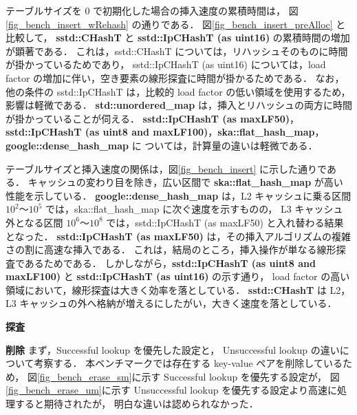 テーブルサイズを 0 で初期化した場合の挿入速度の累積時間は，
図\ref{fig_bench_insert_wRehash} の通りである．
図\ref{fig_bench_insert_preAlloc} と比較して，
{\bf sstd::CHashT} と {\bf sstd::IpCHashT (as uint16)} の累積時間の増加が顕著である．
これは，sstd::CHashT については，リハッシュそのものに時間が掛かっているためであり，
sstd::IpCHashT (as uint16) については，load factor の増加に伴い，空き要素の線形探査に時間が掛かるためである．
なお，他の条件の sstd::IpCHashT は，比較的 load factor の低い領域を使用するため，影響は軽微である．
{\bf std::unordered\_map} は，挿入とリハッシュの両方に時間が掛かっていることが伺える．
{\bf sstd::IpCHashT (as maxLF50)}，{\bf sstd::IpCHashT (as uint8 and maxLF100)}，{\bf ska::flat\_hash\_map}，{\bf google::dense\_hash\_map} に
ついては，計算量の違いは軽微である．

テーブルサイズと挿入速度の関係は，図\ref{fig_bench_insert} に示した通りである．
キャッシュの変わり目を除き，広い区間で {\bf ska::flat\_hash\_map} が高い性能を示している．
{\bf google::dense\_hash\_map} は，L2 キャッシュに乗る区間 $10^2〜 10^5$ では，ska::flat\_hash\_map に次ぐ速度を示すものの，
L3 キャッシュ外となる区間 $10^6〜 10^8$ では，sstd::IpCHashT (as maxLF50) と入れ替わる結果となった．
{\bf sstd::IpCHashT (as maxLF50)} は，その挿入アルゴリズムの複雑さの割に高速な挿入である．
これは，結局のところ，挿入操作が単なる線形探査であるためである．
しかしながら，{\bf sstd::IpCHashT (as uint8 and maxLF100)} と {\bf sstd::IpCHashT (as uint16)} の示す通り，
load factor の高い領域において，線形探査は大きく効率を落としている．
{\bf sstd::CHashT} は L2，L3 キャッシュの外へ格納が増えるにしたがい，大きく速度を落としている．
\leavevmode \newline

%
{\bf 探査}
\samepage\newline\indent
\leavevmode \newline

%
{\bf 削除}
\samepage\newline\indent
まず，Successful lookup を優先した設定と，
Unsuccessful lookup の違いについて考察する．
本ベンチマークでは存在する key-value ペアを削除しているため，
図\ref{fig_bench_erase_sm}に示す Successful lookup を優先する設定が，
図\ref{fig_bench_erase_um}に示す Unsuccessful lookup を優先する設定より高速に処理すると期待されたが，
明白な違いは認められなかった．
\leavevmode \newline


